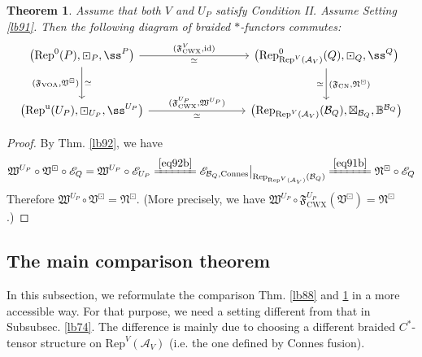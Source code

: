 \documentclass[11pt,b5paper,notitlepage]{article}
\theoremstyle{definition}
\theoremstyle{plain}
\newtheorem{thm}[df]{Theorem}
\newcommand{\fk}{\mathfrak}
\newcommand{\mc}{\mathcal}
\newcommand{\id}{\mathrm{id}}
\newcommand{\Rep}{\mathrm{Rep}}
\newcommand{\uni}{\mathrm{u}}
\newcommand{\scr}{\mathscr}
\newcommand{\RepV}{{\mathrm{Rep}^\uni(V)}}
\newcommand{\mbb}{\mathbb}
\newcommand{\CWX}{{\scriptscriptstyle \mathrm{CWX}}}
\newcommand{\FVCWX}{{\mathfrak F^V_{\scriptscriptstyle \mathrm{CWX}}}}
\newcommand{\VOA}{{\scriptscriptstyle \mathrm{VOA}}}
\newcommand{\CN}{{\scriptscriptstyle \mathrm{CN}}}
\newcommand{\RepUP}{\mathrm{Rep}^{\mathrm u}(U_P)}
\newcommand{\Connes}{\mathrm{Connes}}
\numberwithin{equation}{section}
\begin{document}
\begin{thm}\label{lb94}
Assume that both $V$ and $U_P$ satisfy Condition II. Assume Setting \ref{lb91}. Then the following diagram of braided $*$-functors commutes:
\begin{equation}\label{eq79}
\begin{tikzcd}[row sep=large,column sep=3cm]
\big(\Rep^0(P),\boxdot_P,\ss^P\big) \arrow[r,"{(\fk F^V_\CWX,\id)}","\simeq"'] \arrow[d,"{(\fk F_\VOA,\fk V^\boxdot)}"',"\simeq"] & \big(\Rep^0_{\Rep^V(\mc A_V)}(Q),\boxdot_Q,\ss^Q \big)\arrow[d,"{(\fk F_\CN,\fk N^\boxdot)}","\simeq"'] \\
\big(\RepUP,\boxdot_{U_P},\ss^{U_P} \big)\arrow[r,"{(\fk F^{U_P}_\CWX,\fk W^{U_P})}","\simeq"']           & \big(\Rep_{\Rep^V(\mc A_V)}(\mc B_Q),\boxtimes_{\mc B_Q},\mathbb B^{\mc B_Q} \big)         
\end{tikzcd}
\end{equation}
\end{thm}

\begin{proof}
By Thm. \ref{lb92}, we have
\begin{align*}
\fk W^{U_P}\circ\fk V^\boxdot\circ\scr E_Q=\fk W^{U_P}\circ\scr E_{U_P}\xlongequal{\eqref{eq92b}}\scr E_{\mc B_Q,\Connes}\big|_{\Rep_{\Rep^V(\mc A_V)}(\mc B_Q)}\xlongequal{\eqref{eq91b}}\fk N^\boxdot\circ\scr E_Q
\end{align*}
Therefore $\fk W^{U_P}\circ\fk V^\boxdot=\fk N^\boxdot$. (More precisely, we have $\fk W^{U_P}\circ\fk F^{U_P}_\CWX(\fk V^\boxdot)=\fk N^\boxdot$.)
\end{proof}






\subsection{The main comparison theorem}


In this subsection, we reformulate the comparison Thm. \ref{lb88} and \ref{lb94} in a more accessible way. For that purpose, we need a setting different from that in Subsubsec. \ref{lb74}. The difference is mainly due to choosing a different braided $C^*$-tensor structure on $\Rep^V(\mc A_V)$ (i.e. the one defined by Connes fusion). %
\end{document}
